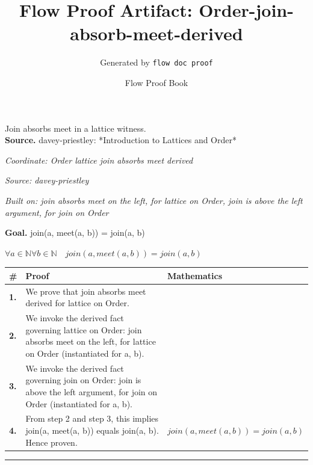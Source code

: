 \documentclass[11pt]{article}
\title{Flow Proof Artifact: Order-join-absorb-meet-derived}
\author{Generated by \texttt{flow doc proof}}
\date{Flow Proof Book}
\theoremstyle{definition}
\begin{document}
\maketitle
Join absorbs meet in a lattice witness.\\[0.5em]
\textbf{Source.} davey-priestley: *Introduction to Lattices and Order*\\[0.5em]
\bigskip
{}\par
\smallskip\noindent\textit{Coordinate: Order \cdot lattice \cdot join absorbs meet derived}\par
\smallskip\noindent\textit{Source: davey-priestley}\par
\smallskip\noindent\textit{Built on: join absorbs meet on the left, for lattice on Order, join is above the left argument, for join on Order}\par
\medskip
\noindent\textbf{Goal.} join(a, meet(a, b)) = join(a, b)\par
\noindent$\displaystyle \forall a \in \mathbb{N} \forall b \in \mathbb{N}\quad join(a, meet(a, b)) = join(a, b)$\par
\medskip
\noindent
\begin{tabular}{@{} >{\raggedright\arraybackslash}p{} >{\raggedright\arraybackslash}p{} >{\raggedleft\arraybackslash}p{} @{}}
\textbf{\#} & \textbf{Proof} & \textbf{Mathematics} \\
\midrule
\textbf{1.} & We prove that join absorbs meet derived for lattice on Order. & \\[0.45em]
\textbf{2.} & We invoke the derived fact governing lattice on Order: join absorbs meet on the left, for lattice on Order (instantiated for a, b). & \\[0.45em]
\textbf{3.} & We invoke the derived fact governing join on Order: join is above the left argument, for join on Order (instantiated for a, b). & \\[0.45em]
\textbf{4.} & From step 2 and step 3, this implies join(a, meet(a, b)) equals join(a, b). Hence proven. & $\displaystyle join(a, meet(a, b)) = join(a, b)$ \\[0.45em]
\bottomrule
\end{tabular}
\label{thm:Order-lattice-join_absorbs_meet_derived}
\par\medskip\hrule
\end{document}
